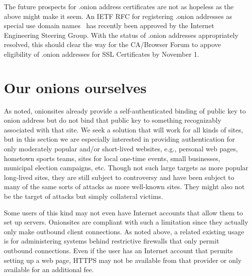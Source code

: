 \documentclass[10pt, conference, compsocconf]{styles/IEEEtran}
\begin{document}
The future prospects for .onion address certificates are not as
hopeless as the above might make it seem.  An IETF RFC for registering
.onion addresses as special use domain names~\cite{ietf-onion-tld-rfc}
has recently been approved by the Internet Engineering Steering Group.
With the status of .onion addresses appropriately resolved, this should
clear the way for the CA/Browser Forum to appove eligibility of .onion
addresses for SSL Certificates by November 1.




% 
% 
% 



\section{Our onions ourselves}
\label{ourselves}

As noted, onionsites already provide a self-authenticated binding of
public key to onion address but do not bind that public key to
something recognizably associated with that site.  We seek a solution
that will work for all kinds of sites, but in this section we are
especially interested in providing authentication for only moderately
popular and/or short-lived websites, e.g., personal web pages,
hometown sports teams, sites for local one-time events, small
businesses, municipal election campaigns, etc.  Though not such large
targets as more popular long-lived sites, they are still subject to
controversy and have been subject to many of the same sorts of attacks
as more well-known sites.  They might also not be the target of
attacks but simply collateral victims.

Some users of this kind may not even have Internet accounts that allow
them to set up servers. Onionsites are compliant with such a
limitation since they actually only make outbound client
connections. As noted above, a related existing usage is for
administering systems behind restrictive firewalls that only permit
outbound connections.  Even if the user has an Internet account that
permits setting up a web page, HTTPS may not be available from that
provider or only available for an additional fee.
\end{document}
